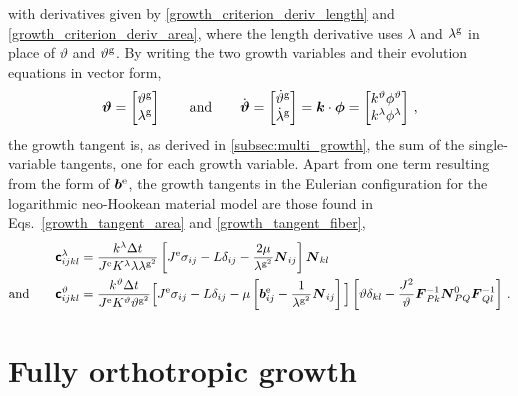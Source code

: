 \documentclass[10pt,letterpaper,oneside]{report}
\newcommand{\ten}[1]{\mbox{\boldmath $#1$}{}}
\newcommand{\tenf}[1]{\mbox{{\sffamily{\bfseries {#1}}}}}
\newcommand{\scas}[1]{\mbox{{\scriptsize{${\rm{#1}}$}}}{}}
\begin{document}
with derivatives given by \autoref{growth_criterion_deriv_length} and \autoref{growth_criterion_deriv_area}, where the length derivative uses $\lambda$ and $\lambda^{\scas{g}}$ in place of $\vartheta$ and $\vartheta^{\scas{g}}$.
By writing the two growth variables and their evolution equations in vector form, 
\begin{equation}
\ten{\vartheta} = \begin{bmatrix} \vartheta^{\scas{g}} \\ \lambda^{\scas{g}} \end{bmatrix} 
\qquad \text{and} \qquad
\dot{\ten{\vartheta} } = \begin{bmatrix} \dot{\vartheta}^{\scas{g}} \\ \dot{\lambda}^{\scas{g}} \end{bmatrix}  = \ten{k} \cdot \ten{\phi} = \begin{bmatrix} k^{\vartheta} \phi^{\vartheta} \\ k^{\lambda} \phi^{\lambda} \end{bmatrix} \, ,
\end{equation}
the growth tangent is, as derived in \autoref{subsec:multi_growth}, the sum of the single-variable tangents, one for each growth variable.  Apart from one term resulting from the form of $\ten{b}^{\scas{e}}$, the growth tangents in the Eulerian configuration for the logarithmic neo-Hookean material model are those found in Eqs.~\ref{growth_tangent_area} and \ref{growth_tangent_fiber},
\begin{align}
\tenf{c}^{\lambda}_{ijkl} 
={}& \frac{k^{\lambda} \Delta t}{J^{\scas{e}} K^\lambda \lambda \lambda^{\scas{g}^2} } 
\left[ J^{\scas{e}} \sigma_{ij} - L \delta_{ij} - \frac{2 \mu}{\lambda^{\scas{g}^2}} \ten{N}_{ij} \right] 
\ten{N}_{kl} 
\\ \text{and} \qquad
\tenf{c}^{\vartheta}_{ijkl} 
={}& \frac{k^{\vartheta} \Delta t}{J^{\scas{e}} K^\vartheta \vartheta^{\scas{g}^2} } 
\Big[ J^{\scas{e}} \sigma_{ij} - L \delta_{ij} - \mu \left[ \ten{b}^{\scas{e}}_{ij} - \frac{1}{\lambda^{\scas{g}^2}} \ten{N}_{ij} \right] \Big] 
\left[ \vartheta \delta_{kl} - \frac{J^2}{\vartheta} \ten{F}^{-1}_{Pk} \ten{N}^0_{PQ} \ten{F}^{-1}_{Ql} \right] \, . 
\end{align}

\section{Fully orthotropic growth}
\end{document}
